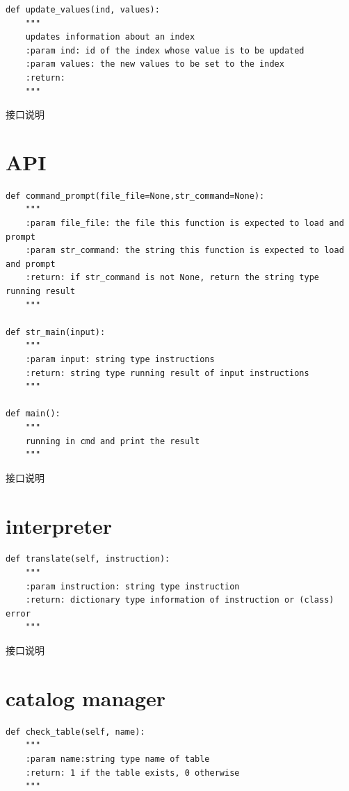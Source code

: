 \documentclass[UTF8]{ctexrep} %
\newenvironment{longlisting}{\captionsetup{type=listing}}{}
\begin{document}
\begin{appendices}
\begin{longlisting}
\begin{verbatim}
def update_values(ind, values):
    """
    updates information about an index
    :param ind: id of the index whose value is to be updated
    :param values: the new values to be set to the index
    :return:
    """
    \end{verbatim}
    \caption{接口说明}
    \label{lst:interface_specification}
\end{longlisting}

\section{API}
\begin{longlisting}
    \begin{verbatim}
def command_prompt(file_file=None,str_command=None):
    """
    :param file_file: the file this function is expected to load and prompt
    :param str_command: the string this function is expected to load and prompt
    :return: if str_command is not None, return the string type running result
    """
    
def str_main(input):
    """
    :param input: string type instructions
    :return: string type running result of input instructions
    """
    
def main():
    """
    running in cmd and print the result
    """
    \end{verbatim}
    \caption{接口说明}
    \label{lst:interface_specification}
\end{longlisting}

\section{interpreter}
\begin{longlisting}
    \begin{verbatim}
def translate(self, instruction):
    """
    :param instruction: string type instruction
    :return: dictionary type information of instruction or (class) error
    """
    \end{verbatim}
    \caption{接口说明}
    \label{lst:interface_specification}
\end{longlisting}

\section{catalog manager}
\begin{longlisting}
    \begin{verbatim}
def check_table(self, name):
	"""
    :param name:string type name of table
    :return: 1 if the table exists, 0 otherwise
    """


\end{verbatim}
\end{longlisting}
\end{appendices}
\end{document}
